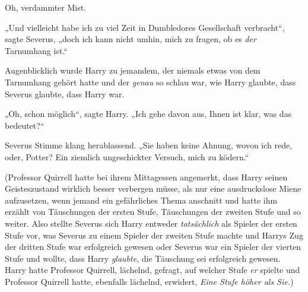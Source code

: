 Oh, verdammter Mist.

„Und vielleicht habe ich zu viel Zeit in Dumbledores Gesellschaft verbracht“, sagte Severus, „doch ich kann nicht umhin, mich zu fragen, ob es \emph{der} Tarnumhang ist.“

Augenblicklich wurde Harry zu jemandem, der niemals etwas von dem Tarnumhang gehört hatte und der \emph{genau} so schlau war, wie Harry glaubte, dass Severus glaubte, dass Harry war.

„Oh, schon möglich“, sagte Harry. „Ich gehe davon aus, Ihnen ist klar, was das bedeutet?“

Severus Stimme klang herablassend. „Sie haben keine Ahnung, wovon ich rede, oder, Potter? Ein ziemlich ungeschickter Versuch, mich zu ködern.“

(Professor Quirrell hatte bei ihrem Mittagessen angemerkt, dass Harry seinen Geisteszustand wirklich besser verbergen müsse, als nur eine ausdruckslose Miene aufzusetzen, wenn jemand ein gefährliches Thema anschnitt und hatte ihm erzählt von Täuschungen der ersten Stufe, Täuschungen der zweiten Stufe und so weiter. Also stellte Severus sich Harry entweder \emph{tatsächlich} als Spieler der ersten Stufe vor, was Severus zu einem Spieler der zweiten Stufe machte und Harrys Zug der dritten Stufe war erfolgreich gewesen oder Severus war ein Spieler der vierten Stufe und wollte, dass Harry \emph{glaubte}, die Täuschung sei erfolgreich gewesen. Harry hatte Professor Quirrell, lächelnd, gefragt, auf welcher Stufe \emph{er} spielte und Professor Quirrell hatte, ebenfalls lächelnd, erwidert, \emph{Eine Stufe höher als Sie.})

